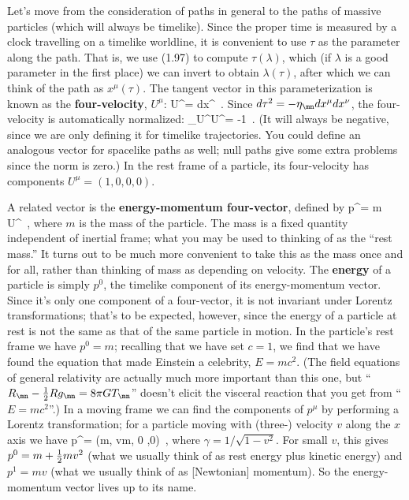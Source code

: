 Let's move from the consideration of paths in general to the paths
of massive particles (which will always be timelike).  Since the proper 
time is measured by a clock travelling on a timelike worldline,
it is convenient to use $\tau$ as the parameter along the path.
That is, we use (1.97) to compute $\tau(\lambda)$, which (if $\lambda$
is a good parameter in the first place) we can invert to obtain
$\lambda(\tau)$, after which we can think of the path as
$x^\mu(\tau)$.  The tangent vector in this parameterization is known
as the {\bf four-velocity}, $U^\mu$:
\be
  U^\mu = {{dx^\mu}}\ .\label{1.98}
\ee
Since $d\tau^2 = -\eta_\mn dx^\mu dx^\nu$, the four-velocity is
automatically normalized:
\be
  \eta_\mn U^\mu U^\nu = -1\ .\label{1.99}
\ee
(It will always be negative, since we are only defining it for timelike
trajectories.  You could define an analogous vector for spacelike
paths as well; null paths give some extra problems since the norm is
zero.)  In the rest frame of a particle, its four-velocity has
components $U^\mu = (1,0,0,0)$.

A related vector is the {\bf energy-momentum four-vector}, defined by
\be
  p^\mu = m U^\mu\ ,\label{1.100}
\ee
where $m$ is the mass of the particle.  The mass is a fixed quantity
independent of inertial frame; what you may be used to thinking of as
the ``rest mass.''  It turns out to be much more convenient to take
this as the mass once and for all, rather than thinking of mass as
depending on velocity.  The {\bf energy} of a particle is simply
$p^0$, the timelike component of its energy-momentum vector. 
Since it's only one component of a four-vector, it is not invariant
under Lorentz transformations; that's to be expected, however, since
the energy of a particle at rest is not the same as that of the same
particle in motion.  In the
particle's rest frame we have $p^0 =m$; recalling that we have set
$c=1$, we find that we have found the equation that made Einstein
a celebrity, $E=mc^2$.  (The field equations of general relativity are
actually much more important than this one, but ``$R_\mn - {1\over 2}
Rg_\mn = 8\pi G T_\mn$'' doesn't elicit the visceral reaction that
you get from ``$E=mc^2$''.)  In a moving frame we can find the components
of $p^\mu$ by performing a Lorentz transformation; for a particle 
moving with (three-) velocity $v$ along the $x$ axis we have
\be
  p^\mu = (\gamma m, v\gamma m, 0 ,0)\ ,\label{1.101}
\ee
where $\gamma = 1/\sqrt{1-v^2}$.  For small $v$, this gives
$p^0 = m+{1\over 2}mv^2$ (what we usually think of as rest energy
plus kinetic energy) and $p^1 = mv$ (what we usually think of as
[Newtonian] momentum).  So the energy-momentum vector lives up to its 
name.

